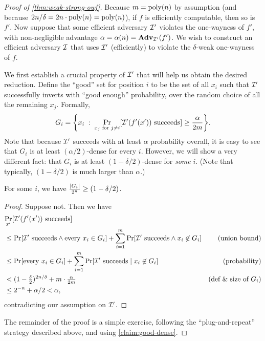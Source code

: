 \documentclass[11pt]{article}
\begin{document}
\begin{proof}[Proof of \cref{thm:weak-strong-owf}]
  Because $m = \operatorname{poly}(n)$ by assumption (and because $2n/\delta = 2n
  \cdot \operatorname{poly}(n) = \operatorname{poly}(n)$), if $f$ is efficiently computable, then
  so is $f'$.  Now suppose that some efficient adversary $\mathcal{I}'$
  violates the one-wayness of $f'$, with non-negligible advantage
  $\alpha = \alpha(n) = \mathbf{Adv}_{\mathcal{I}'}(f')$.  We wish to construct an
  efficient adversary $\mathcal{I}$ that uses $\mathcal{I}'$ (efficiently) to
  violate the $\delta$-weak one-wayness of $f$.

  We first establish a crucial property of $\mathcal{I}'$ that will help us
  obtain the desired reduction.  Define the ``good'' set for position
  $i$ to be the set of all $x_{i}$ such that $\mathcal{I}'$ successfully
  inverts with ``good enough'' probability, over the random choice of
  all the remaining $x_{j}$.  Formally, \[ G_{i} = \set*{ x_{i}\;
    :\; \Pr_{x_{j} \text{ for } j \neq i} \bracks*{ \Inv'(f'(x'))
      \text{ succeeds} } \geq \frac{\alpha}{2m}}. \] Note that because
  $\mathcal{I}'$ succeeds with at least $\alpha$ probability overall, it is
  easy to see that $G_{i}$ is at least $(\alpha/2)$-dense for every
  $i$.  However, we will show a very different fact: that $G_{i}$ is
  at least $(1-\delta/2)$-dense for \emph{some} $i$.  (Note that
  typically, $(1-\delta/2)$ is much larger than $\alpha$.)

  \begin{claim}
    \label{claim:good-dense}
    For some $i$, we have $\frac{\lvert G_{i}\rvert}{2^{n}} \geq
    (1-\delta/2)$.
  \end{claim}

  \begin{proof}
    Suppose not.  Then we have
    \begin{align*}
      \lefteqn{\Pr_{x'}[\Inv'(f'(x')) \text{ succeeds]}} \\
      &\leq \Pr[\Inv' \text{ succeeds} \wedge \text{every } x_{i} \in
      G_{i}] + \sum_{i=1}^{m} \Pr[\Inv' \text{ succeeds} \wedge
      x_{i} \not\in G_{i}] & \text{(union bound)} \\
      &\leq \Pr[\text{every } x_{i} \in G_{i}] + \sum_{i=1}^{m}
      \Pr[\Inv' \text{ succeeds}\; |\; x_{i} \not\in
      G_{i}] & \text{(probability)} \\
      &< (1-\tfrac{\delta}{2})^{2n/\delta} + m \cdot \tfrac{\alpha}{2m}
      & \text{(def \& size of $G_{i}$)} \\
      &\leq 2^{-n} + \alpha/2 < \alpha,
    \end{align*}
    contradicting our assumption on $\mathcal{I}'$.
  \end{proof}

  The remainder of the proof is a simple exercise, following the
  ``plug-and-repeat'' strategy described above, and using
  \cref{claim:good-dense}.
\end{proof}
\end{document}
